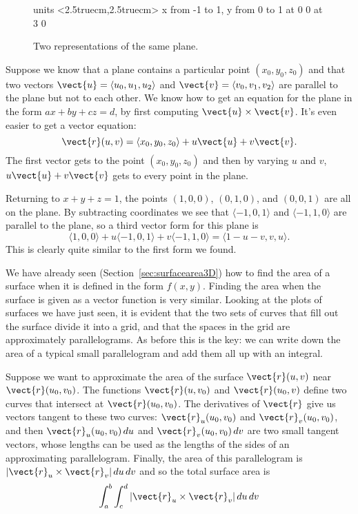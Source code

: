 \begin{figure}[H]
\centerline{
\vbox{\beginpicture
\normalgraphs
\setcoordinatesystem units <2.5truecm,2.5truecm>
\setplotarea x from -1 to 1, y from 0 to 1
 at 0 0
 at 3 0
\endpicture}}
\caption{Two representations of the same plane. \label{fig:two plane parameterizations}}
\end{figure}

Suppose we know that a plane contains a particular point
$(x_0,y_0,z_0)$ and that two vectors $\vect{u}=\langle
u_0,u_1,u_2\rangle$ and $\vect{v}=\langle
v_0,v_1,v_2\rangle$ are parallel to the plane but not to each
other. We know how to get an equation for the plane in the form
$ax+by+cz=d$, by first computing $\vect{u}\times\vect{v}$. It's even
easier to get a vector equation:
$$\vect{r}(u,v) = \langle x_0,y_0,z_0\rangle + u\vect{u} + v\vect{v}.$$
The first vector gets to the point $(x_0,y_0,z_0)$ and then by varying
$u$ and $v$, $u\vect{u} + v\vect{v}$ gets to every point in the plane.

Returning to $x+y+z=1$, the points $(1,0,0)$, $(0,1,0)$, and $(0,0,1)$
are all on the plane. By subtracting coordinates we see that
$\langle -1,0,1\rangle$ and $\langle -1,1,0\rangle$ are parallel to
the plane, so a third vector form for this plane is
$$\langle 1,0,0\rangle + u\langle -1,0,1\rangle + v\langle
-1,1,0\rangle
= \langle 1-u-v,v,u\rangle.$$
This is clearly quite similar to the first form we found.

We have already seen (Section~\ref{sec:surfacearea3D})
how to find the area of a surface when it is
defined in the form $f(x,y)$. Finding the area when the surface is
given as a vector function is very similar. Looking at the plots of
surfaces we have just seen, it is evident that the two sets of curves
that fill out the surface divide it into a grid, and that the spaces
in the grid are approximately parallelograms. As before this is the
key: we can write down the area of a typical small parallelogram and
add them all up with an integral.

Suppose we want to approximate the area of the surface $\vect{r}(u,v)$
near $\vect{r}(u_0,v_0)$. The functions $\vect{r}(u,v_0)$ and $\vect{r}(u_0,v)$ define two curves that intersect at $\vect{r}(u_0,v_0)$. The derivatives of $\vect{r}$ give us vectors tangent to
these two curves: $\vect{r}_u(u_0,v_0)$ and $\vect{r}_v(u_0,v_0)$, and
then $\vect{r}_u(u_0,v_0)\,du$ and $\vect{r}_v(u_0,v_0)\,dv$
are two small tangent vectors, whose lengths can be used as the
lengths of the sides of an approximating parallelogram. Finally, the
area of this parallelogram is $|\vect{r}_u\times\vect{r}_v|\,du\,dv$ and
so the total surface area is
\begin{equation} \label{eq:surfaceareaintegral}
\int_a^b\int_c^d |\vect{r}_u\times\vect{r}_v|\,du\,dv
\end{equation}


